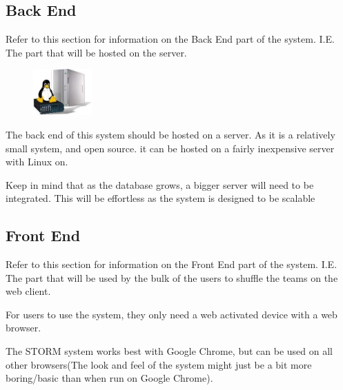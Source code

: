 \subsection{Back End}
	Refer to this section for information on the Back End part of the system. I.E. The part that will be hosted on the server.\par
	\vspace{0.3cm}
	
\begin{figure}
    \includegraphics[width=0.2\textwidth]{./graphics/LinuxServer.jpg}
\end{figure}

The back end of this system should be hosted on a server.
As it is a relatively small system, and open source. it can be hosted on a fairly inexpensive server with Linux on.

Keep in mind that as the database grows, a bigger server will need to be integrated.  This will be effortless as the system is designed to be scalable

\subsection{Front End}
	Refer to this section for information on the Front End part of the system. I.E. The part that will be 	used by the bulk of the users to shuffle the teams on the web client.\par
	\vspace{0.3cm}
	
For users to use the system, they only need a web activated device with a web browser.

The STORM system works best with Google Chrome, but can be used on all other browsers(The look and feel of the system might just be a bit more boring/basic than when run on Google Chrome).

